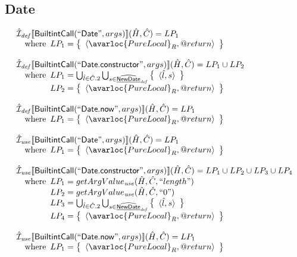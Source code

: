 \subsection{Date}
\[
\begin{array}{l}

\aI_{\it def}\lbr \SF{BuiltintCall}(``\SF{Date}",args)\rbr(\hat{H},\hat{C})
  = LP_1 \\
\quad\wherec{
  LP_1 = \set{\langle\avarloc{PureLocal}_R,\varprop{return}\rangle}\\
  }\\
\\


\aI_{\it def}\lbr \SF{BuiltintCall}(``\SF{Date.constructor}",args)\rbr(\hat{H},\hat{C})
  = LP_1 \cup LP_2\\
\quad\wherec{
  LP_1 = \bigcup_{\hat{l} \in \hat{C}.2} \bigcup_{s \in \ahf{NewDate}_{\it def}}
    \set{\langle \hat{l}, s \rangle}\\
  LP_2 = \set{\langle\avarloc{PureLocal}_R,\varprop{return}\rangle}\\
  }\\
\\

\aI_{\it def}\lbr \SF{BuiltintCall}(``\SF{Date.now}",args)\rbr(\hat{H},\hat{C})
  = LP_1 \\
\quad\wherec{
  LP_1 = \set{\langle\avarloc{PureLocal}_R,\varprop{return}\rangle}\\
  }\\
\\

\aI_{\it use}\lbr \SF{BuiltintCall}(``\SF{Date}",args)\rbr(\hat{H},\hat{C})
  = LP_1 \\
\quad\wherec{
  LP_1 = \set{\langle\avarloc{PureLocal}_R,\varprop{return}\rangle}\\
  }\\
\\


\aI_{\it use}\lbr \SF{BuiltintCall}(``\SF{Date.constructor}",args)\rbr(\hat{H},\hat{C})
  = LP_1 \cup LP_2 \cup LP_3 \cup LP_4\\
\quad\wherec{
  LP_1 = getArgValue_{\it use}(\hat{H}, \hat{C}, ``length")\\
  LP_2 = getArgValue_{\it use}(\hat{H}, \hat{C}, ``0")\\
  LP_3 = \bigcup_{\hat{l} \in \hat{C}.2} \bigcup_{s \in \ahf{NewDate}_{\it def}}
    \set{\langle \hat{l}, s \rangle}\\
  LP_4 = \set{\langle\avarloc{PureLocal}_R,\varprop{return}\rangle}\\
  }\\
\\

\aI_{\it use}\lbr \SF{BuiltintCall}(``\SF{Date.now}",args)\rbr(\hat{H},\hat{C})
  = LP_1 \\
\quad\wherec{
  LP_1 = \set{\langle\avarloc{PureLocal}_R,\varprop{return}\rangle}\\
  }\\
\\

\end{array}
\]


